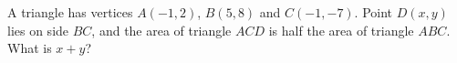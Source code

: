 A triangle has vertices $A(-1,2)$, $B(5,8)$ and $C(-1,-7)$. Point $D(x,y)$ lies on side $BC$, and the area of triangle $ACD$ is half the area of triangle $ABC$. What is $x+y$?
